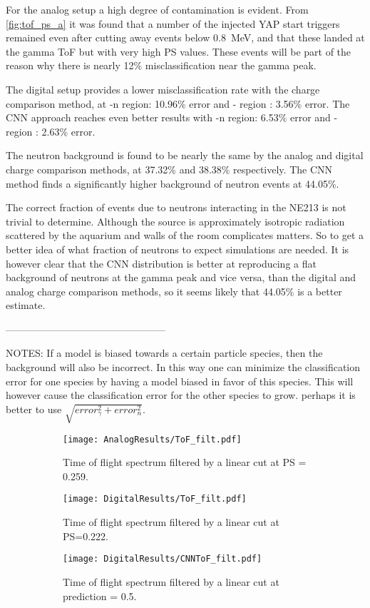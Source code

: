\documentclass[main.tex]{subfiles}
\begin{document}
For the analog setup a high degree of contamination is evident. From \ref{fig:tof_ps_a} it was found that a number of the injected YAP start triggers remained even after cutting away events below \SI{0.8}{\MeV}, and that these landed at the gamma ToF but with very high PS values. These events will be part of the reason why there is nearly 12\% misclassification near the gamma peak.

The digital setup provides a lower misclassification rate with the charge comparison method, at \textgamma-n region: 10.96\% error and \textgamma-\textgamma\; region : 3.56\% error. The CNN approach reaches even better results with \textgamma-n region: 6.53\% error and \textgamma-\textgamma\; region : 2.63\% error.

The neutron background is found to be nearly the same by the analog and digital charge comparison methods, at 37.32\% and 38.38\% respectively. The CNN method finds a significantly higher background of neutron events at 44.05\%. 

The correct fraction of events due to neutrons interacting in the NE213 is not trivial to determine. Although the source is approximately isotropic radiation scattered by the aquarium and walls of the room complicates matters. So to get a better idea of what fraction of neutrons to expect simulations are needed. It is however clear that the CNN distribution is better at reproducing a flat background of neutrons at the gamma peak and vice versa, than the digital and analog charge comparison methods, so it seems likely that 44.05\% is a better estimate.

------------------------------------------------

NOTES: If a model is biased towards a certain particle species, then the background will also be incorrect. In this way one can minimize the classification error for one species by having a model biased in favor of this species. This will however cause the classification error for the other species to grow. perhaps it is better to use $\sqrt{error_\gamma^2+error_n^2}$.



\begin{figure}
    \centering
    \begin{subfigure}[bh]{\textwidth}
   	   	\centering
	    \texttt{[image: AnalogResults/ToF\_filt.pdf]}
        \label{fig:ToF_filt_A}
    	\caption{Time of flight spectrum filtered by a linear cut at PS = 0.259.}
    	\label{fig:ToF_filt_A}
   	\end{subfigure}
    \begin{subfigure}[bh]{\textwidth}
   	    \centering
        \texttt{[image: DigitalResults/ToF\_filt.pdf]}
        \caption{Time of flight spectrum filtered by a linear cut at PS=0.222.}
        \label{fig:ToF_filt_D}
    \end{subfigure}
	\begin{subfigure}[bh]{\textwidth}
	    \centering
        \texttt{[image: DigitalResults/CNNToF\_filt.pdf]}
        \caption{Time of flight spectrum filtered by a linear cut at prediction = 0.5.}
        \label{fig:ToF_filt_D_CNN}
    \end{subfigure}
	
	\caption{}
    \label{fig:tof_cc_cnn}
\end{figure}
\end{document}
